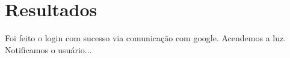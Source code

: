\part{Resultados}

Foi feito o login com sucesso via comunicação com google.
Acendemos a luz. 
Notificamos o usuário...